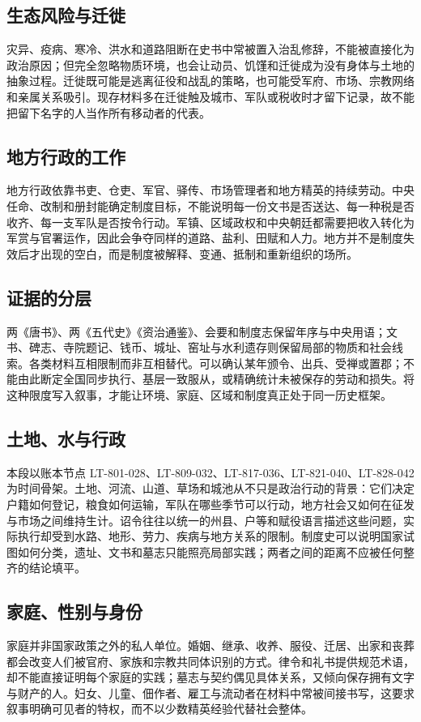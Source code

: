 \subsection{生态风险与迁徙}
灾异、疫病、寒冷、洪水和道路阻断在史书中常被置入治乱修辞，不能被直接化为政治原因；但完全忽略物质环境，也会让动员、饥馑和迁徙成为没有身体与土地的抽象过程。迁徙既可能是逃离征役和战乱的策略，也可能受军府、市场、宗教网络和亲属关系吸引。现存材料多在迁徙触及城市、军队或税收时才留下记录，故不能把留下名字的人当作所有移动者的代表。

\subsection{地方行政的工作}
地方行政依靠书吏、仓吏、军官、驿传、市场管理者和地方精英的持续劳动。中央任命、改制和册封能确定制度目标，不能说明每一份文书是否送达、每一种税是否收齐、每一支军队是否按令行动。军镇、区域政权和中央朝廷都需要把收入转化为军赏与官署运作，因此会争夺同样的道路、盐利、田赋和人力。地方并不是制度失效后才出现的空白，而是制度被解释、变通、抵制和重新组织的场所。

\subsection{证据的分层}
两《唐书》、两《五代史》《资治通鉴》、会要和制度志保留年序与中央用语；文书、碑志、寺院题记、钱币、城址、窑址与水利遗存则保留局部的物质和社会线索。各类材料互相限制而非互相替代。可以确认某年颁令、出兵、受禅或置郡；不能由此断定全国同步执行、基层一致服从，或精确统计未被保存的劳动和损失。将这种限度写入叙事，才能让环境、家庭、区域和制度真正处于同一历史框架。
\subsection{土地、水与行政}
本段以账本节点 LT-801-028、LT-809-032、LT-817-036、LT-821-040、LT-828-042 为时间骨架。土地、河流、山道、草场和城池从不只是政治行动的背景：它们决定户籍如何登记，粮食如何运输，军队在哪些季节可以行动，地方社会又如何在征发与市场之间维持生计。诏令往往以统一的州县、户等和赋役语言描述这些问题，实际执行却受到水路、地形、劳力、疾病与地方关系的限制。制度史可以说明国家试图如何分类，遗址、文书和墓志只能照亮局部实践；两者之间的距离不应被任何整齐的结论填平。

\subsection{家庭、性别与身份}
家庭并非国家政策之外的私人单位。婚姻、继承、收养、服役、迁居、出家和丧葬都会改变人们被官府、家族和宗教共同体识别的方式。律令和礼书提供规范术语，却不能直接证明每个家庭的实践；墓志与契约偶见具体关系，又倾向保存拥有文字与财产的人。妇女、儿童、佃作者、雇工与流动者在材料中常被间接书写，这要求叙事明确可见者的特权，而不以少数精英经验代替社会整体。

